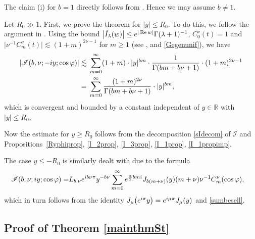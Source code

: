 \documentclass[10pt,a4paper]{article}
\numberwithin{equation}{section}
\def\R{\mathbb{R}}%
\DeclareMathOperator{\re}{Re}%
\def\f{\varphi}
\def\l{\lambda}
\def\m{\mu}
\def\n{\nu}
\newcommand{\sI}{\mathscr{I}}
\begin{document}
The claim (i) for $b=1$ directly follows from \cite[equation~(4.45)]{BKO}. Hence we may assume $b\neq 1$.





Let $R_0\gg 1$. First, we prove the theorem for $|y|\leq R_0$. To do this, we follow the argument in \cite[Lemma 4.17]{BKO}.
Using the bound $\big|\tilde{I}_{\l}(w)\big|\leq {\rm e}^{|\re w|}\Gamma(\l+1)^{-1}$, $C_0^{\n}(t)=1$ and $\big|\n^{-1}C_{m}^{\n}(t)\big|\lesssim (1+m)^{2\n-1}$ for $m\geq 1$ (see \cite[equation~(4.16)]{BKO}, \cite[Fact 4.8]{BKO} and \eqref{Gegenunif}), we have
\begin{align*}
|\sI(b,\nu;-{\rm i}y;\cos\f)|\lesssim{}& \sum_{m=0}^{\infty}(1+m)\cdot |y|^{bm}\cdot \frac{1}{\Gamma(bm+b\n+1)}\cdot (1+m)^{2\n-1}\\
={}&\sum_{m=0}^{\infty}\frac{(1+m)^{2\n}}{\Gamma(bm+b\n+1)}\cdot |y|^{bm},
\end{align*}
which is convergent and bounded by a constant independent of $y\in \R$ with $|y|\leq R_0$.




Now the estimate for $y\geq R_0$ follows from the decomposition \eqref{sIdecom} of $\sI$ and Propositions~\ref{Ryphiprop}, \ref{I_2prop}, \ref{I_3prop}, \ref{I_1prop}, \ref{I_1propimp}.


The case $y\leq -R_0$ is similarly dealt with due to the formula
\begin{align*}
\sI(b,\nu;{\rm i}y;\cos\f)=&L_{b,\n}{\rm e}^{{\rm i}b\n\pi}y^{-b\n}\sum_{m=0}^{\infty}{\rm e}^{\frac{\pi}{2}bm{\rm i}}J_{b(m+\n)}(y)(m+\nu)\n^{-1}C^{\nu}_m(\cos\f),
\end{align*}
which in turn follows from the identity $J_{\m}\bigl({\rm e}^{{\rm i}\pi}y\bigr)={\rm e}^{{\rm i}\m\pi}J_{\m}(y)$ and \eqref{sumbesell}.





















\subsection[Proof of Theorem 1.1]{Proof of Theorem \ref{mainthmSt}}\label{subsec:Stpf}
\end{document}
